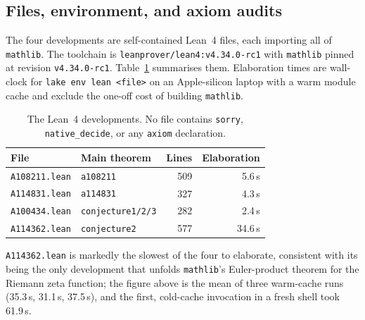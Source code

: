 \documentclass[11pt]{article}
\theoremstyle{plain}
\theoremstyle{definition}
\theoremstyle{remark}
\numberwithin{equation}{section}
\begin{document}
\subsection{Files, environment, and axiom audits}

The four developments are self-contained Lean~4 files, each importing all of \texttt{mathlib}.
The toolchain is \texttt{leanprover/lean4:v4.34.0-rc1} with \texttt{mathlib} pinned at revision
\texttt{v4.34.0-rc1}. Table~\ref{tab:lean} summarises them. Elaboration times are wall-clock for
\texttt{lake env lean <file>} on an Apple-silicon laptop with a warm module cache and exclude
the one-off cost of building \texttt{mathlib}.

\begin{table}[ht]
\centering
\begin{tabular}{@{}llrr@{}}
\toprule
File & Main theorem & Lines & Elaboration \\
\midrule
\texttt{A108211.lean} & \texttt{a108211} & 509 & 5.6\,s \\
\texttt{A114831.lean} & \texttt{a114831} & 327 & 4.3\,s \\
\texttt{A100434.lean} & \texttt{conjecture1/2/3} & 282 & 2.4\,s \\
\texttt{A114362.lean} & \texttt{conjecture2} & 577 & 34.6\,s \\
\bottomrule
\end{tabular}
\caption{The Lean~4 developments. No file contains \texttt{sorry}, \texttt{native\_decide}, or
any \texttt{axiom} declaration.}
\label{tab:lean}
\end{table}

\texttt{A114362.lean} is markedly the slowest of the four to elaborate, consistent with its being
the only development that unfolds \texttt{mathlib}'s Euler-product theorem for the Riemann zeta
function; the figure above is the mean of three warm-cache runs (35.3\,s, 31.1\,s, 37.5\,s), and
the first, cold-cache invocation in a fresh shell took 61.9\,s.
\end{document}
